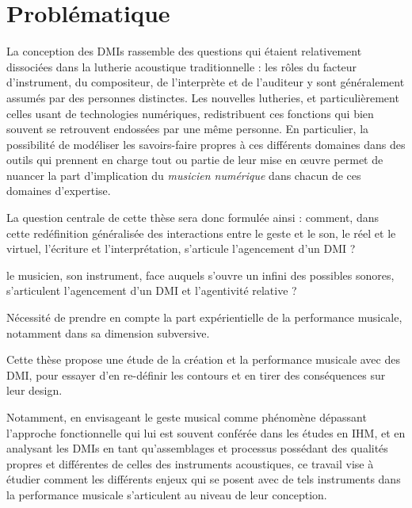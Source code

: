 \section{Problématique}

\noindent La conception des \glspl{DMI} rassemble des questions qui étaient relativement dissociées dans la lutherie acoustique traditionnelle : les rôles du facteur d'instrument, du compositeur, de l'interprète et de l'auditeur y sont généralement assumés par des personnes distinctes. Les nouvelles lutheries, et particulièrement celles usant de technologies numériques, redistribuent ces fonctions qui bien souvent se retrouvent endossées par une même personne. En particulier, la possibilité de modéliser les savoirs-faire propres à ces différents domaines dans des outils qui prennent en charge tout ou partie de leur mise en œuvre permet de nuancer la part d'implication du \textit{musicien numérique} dans chacun de ces domaines d'expertise.

\indent La question centrale de cette thèse sera donc formulée ainsi : comment, dans cette redéfinition généralisée des interactions entre le geste et le son, le réel et le virtuel, l'écriture et l'interprétation, s'articule l'agencement d'un \gls{DMI} ?

le musicien, son instrument, face auquels s'ouvre un infini des possibles sonores, s'articulent l'agencement d'un \gls{DMI} et l'agentivité relative ?


Nécessité de prendre en compte la part expérientielle de la performance musicale, notamment dans sa dimension subversive.

Cette thèse propose une étude de la création et la performance musicale avec des \gls{DMI}, pour essayer d'en re-définir les contours et en tirer des conséquences sur leur design.

Notamment, en envisageant le geste musical comme phénomène dépassant l'approche fonctionnelle qui lui est souvent conférée dans les études en \gls{IHM}, et en analysant les \glspl{DMI} en tant qu'assemblages et processus possédant des qualités propres et différentes de celles des instruments acoustiques, ce travail vise à étudier comment les différents enjeux qui se posent avec de tels instruments dans la performance musicale s'articulent au niveau de leur conception.

